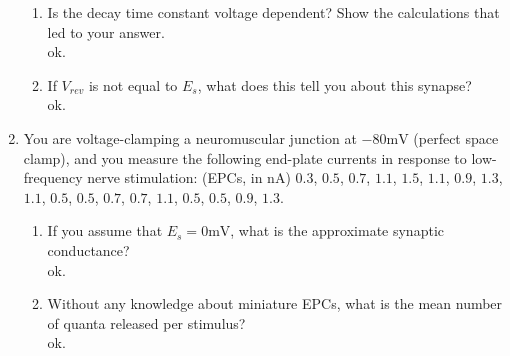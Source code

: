\documentclass[11pt]{article}
\begin{document}
\begin{enumerate}[label=\arabic*.]
\begin{enumerate}[label=(\alph*)]
\item
Is the decay time constant voltage dependent? Show the calculations that led to your answer.
\vspace*{1\baselineskip}
\\
ok.















\item
If $V_{rev}$ is not equal to $E_s$, what does this tell you about this synapse?
\vspace*{1\baselineskip}
\\
ok.














\end{enumerate}



\newpage
\item
You are voltage-clamping a neuromuscular junction at $-80 \text{mV}$ (perfect space clamp), and you measure the following end-plate currents in response to low-frequency nerve stimulation: (EPCs, in nA) $0.3$, $0.5$, $0.7$, $1.1$, $1.5$, $1.1$, $0.9$, $1.3$, $1.1$, $0.5$, $0.5$, $0.7$, $0.7$, $1.1$, $0.5$, $0.5$, $0.9$, $1.3$.
\begin{enumerate}[label=(\alph*)]
\item
If you assume that $E_s = 0 \text{mV}$, what is the approximate synaptic conductance?
\vspace*{1\baselineskip}
\\
ok.











\item
Without any knowledge about miniature EPCs, what is the mean number of quanta released per stimulus?
\vspace*{1\baselineskip}
\\
ok.












\end{enumerate}
\end{enumerate}
\end{document}
